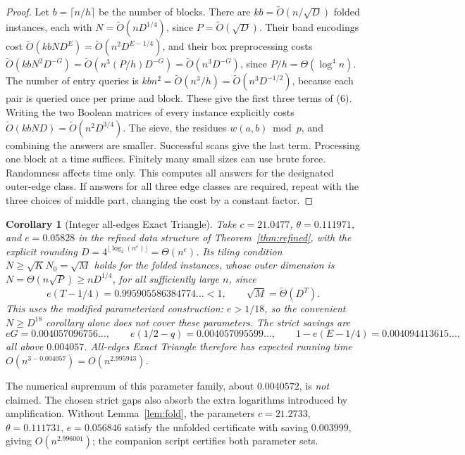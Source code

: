 \documentclass[11pt]{article}
\newtheorem{corollary}[theorem]{Corollary}
\newcommand{\softO}{\widetilde O}
\begin{document}
\begin{proof}
Let $b=\lceil n/h\rceil$ be the number of blocks. There are
$kb=\softO(n/\sqrt D)$ folded instances, each with $N=\softO(nD^{1/4})$,
since $P=\softO(\sqrt D)$. Their band encodings cost
$\softO(kbND^E)=\softO(n^2D^{E-1/4})$, and their box preprocessing costs
$\softO(kbN^2D^{-G})=\softO(n^3(P/h)D^{-G})=\softO(n^3D^{-G})$, since
$P/h=\Theta(\log^4n)$. The number of entry queries is
$kbn^2=\softO(n^3/h)=\softO(n^3D^{-1/2})$, because each pair is queried
once per prime and block. These give the first three terms of (6).
Writing the two Boolean matrices of every instance explicitly costs
$\softO(kbND)=\softO(n^2D^{3/4})$.
The sieve, the residues $w(a,b)\bmod p$, and combining the answers are
smaller. Successful scans give the last term. Processing one block at a
time suffices.
Finitely many small sizes can use brute force. Randomness affects time only.
This computes all answers for the designated outer-edge class. If answers
for all three edge classes are required, repeat with the three choices of
middle part, changing the cost by a constant factor.
\end{proof}

\begin{corollary}[Integer all-edges Exact Triangle]
Take $c=21.0477$, $\theta=0.111971$, and $e=0.05828$ in the refined
data structure of Theorem~\ref{thm:refined}, with the explicit
rounding $D=4^{\lfloor\log_4(n^e)\rfloor}=\Theta(n^e)$. Its tiling
condition $N\ge\sqrt K N_0=\sqrt M$ holds for the folded instances, whose
outer dimension is $N=\Theta(n\sqrt P)\ge nD^{1/4}$, for all sufficiently
large $n$, since
\[
e(T-1/4)=0.995905586384774\ldots<1,
\qquad \sqrt M=\widetilde\Theta(D^T).
\]
This uses the modified parameterized construction: $e>1/18$, so the
convenient $N\ge D^{18}$ corollary alone does not cover these parameters.
The strict savings are
\[
eG=0.004057096756\ldots,\qquad
e(1/2-q)=0.004057095599\ldots,\qquad
1-e(E-1/4)=0.004094413615\ldots,
\]
all above $0.004057$. All-edges Exact Triangle therefore
has expected running time $O(n^{3-0.004057})=O(n^{2.995943})$.
\end{corollary}
The numerical supremum of this parameter family, about $0.0040572$, is
\emph{not} claimed. The chosen strict gaps also absorb the extra logarithms
introduced by amplification. Without Lemma~\ref{lem:fold}, the parameters
$c=21.2733$, $\theta=0.111731$, $e=0.056846$ satisfy the unfolded
certificate with saving $0.003999$, giving $O(n^{2.996001})$; the companion
script certifies both parameter sets.
\end{document}
